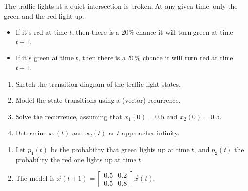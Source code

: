 \documentclass[../main.tex]{subfiles}
\begin{document}
\begin{exercise}
  The traffic lights at a quiet intersection is broken.  At any given time, only the green and the red light up.
  \begin{itemize}
    \item If it's red at time \(t\), then there is a \(20\%\) chance it will turn green at time \(t+1\).
    \item If it's green at time \(t\), then there is a \(50\%\) chance it will turn red at time \(t+1\).
  \end{itemize}

  \begin{enumerate}
    \item Sketch the transition diagram of the traffic light states.
    \item Model the state transitions using a (vector) recurrence.
    \item Solve the recurrence, assuming that \(x_{1}(0) = 0.5\) and \(x_{2}(0) = 0.5\).
    \item Determine \(x_{1}(t)\) and \(x_{2}(t)\) as \(t\) approaches infinity.
  \end{enumerate}

  \begin{solution} \phantom{top}

    \begin{enumerate}
      \item Let \(p_{1}(t)\) be the probability that green lights up at time \(t\), and \(p_{2}(t)\) the probability the red one lights up at time \(t\).


      \item The model is \(\vec{x}(t+1) = \begin{bmatrix} 0.5 & 0.2 \\ 0.5 & 0.8 \end{bmatrix} \vec{x}(t)\).


\end{enumerate}
\end{solution}
\end{exercise}
\end{document}
